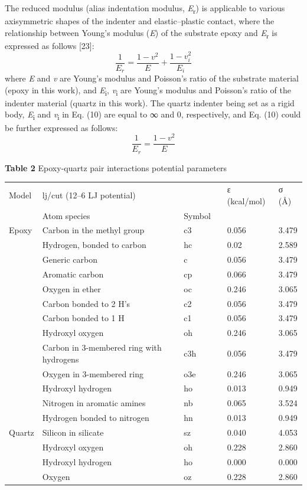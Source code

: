 \documentclass{article}
\begin{document}
The reduced modulus (alias indentation modulus, \emph{E}\textsubscript{r}) is applicable to various axisymmetric shapes of the indenter and elastic–plastic contact, where the relationship between Young’s modulus (\emph{E}) of the substrate epoxy and \emph{E}\textsubscript{r} is expressed as follows [23]:
\begin{equation}
\frac{1}{E_r}=\frac{1-v^2}{E}+\frac{1-v_i^2}{E_i}\tag{10}
\end{equation}
where \emph{E} and \emph{v} are Young’s modulus and Poisson’s ratio of the substrate material (epoxy in this work), and \emph{E}\textsubscript{i}, \emph{v}\textsubscript{i} are Young’s modulus and Poisson’s ratio of the indenter material (quartz in this work). The quartz indenter being set as a rigid body, \emph{E}\textsubscript{i} and \emph{v}\textsubscript{i} in Eq. (10) are equal to ∞ and 0, respectively, and Eq. (10) could be further expressed as follows:
\begin{equation}
\frac{1}{E_r}=\frac{1-v^2}{E}\tag{11}
\end{equation}

\noindent\textbf{Table 2} Epoxy-quartz pair interactions potential parameters
\begin{center}\footnotesize
\begin{tabular}{llllp{1.5cm}l}
\toprule
Model & \multicolumn{2}{l}{lj/cut (12–6 LJ potential)} & & ε (kcal/mol) & σ (Å)\\
 & Atom species & Symbol & & & \\
\midrule
Epoxy & Carbon in the methyl group & c3 & & 0.056 & 3.479\\
 & Hydrogen, bonded to carbon & hc & & 0.02 & 2.589\\
 & Generic carbon & c & & 0.056 & 3.479\\
 & Aromatic carbon & cp & & 0.066 & 3.479\\
 & Oxygen in ether & oc & & 0.246 & 3.065\\
 & Carbon bonded to 2 H’s & c2 & & 0.056 & 3.479\\
 & Carbon bonded to 1 H & c1 & & 0.056 & 3.479\\
 & Hydroxyl oxygen & oh & & 0.246 & 3.065\\
 & Carbon in 3-membered ring with hydrogens & c3h & & 0.056 & 3.479\\
 & Oxygen in 3-membered ring & o3e & & 0.246 & 3.065\\
 & Hydroxyl hydrogen & ho & & 0.013 & 0.949\\
 & Nitrogen in aromatic amines & nb & & 0.065 & 3.524\\
 & Hydrogen bonded to nitrogen & hn & & 0.013 & 0.949\\
Quartz & Silicon in silicate & sz & & 0.040 & 4.053\\
 & Hydroxyl oxygen & oh & & 0.228 & 2.860\\
 & Hydroxyl hydrogen & ho & & 0.000 & 0.000\\
 & Oxygen & oz & & 0.228 & 2.860\\
\bottomrule
\end{tabular}
\end{center}
\end{document}
